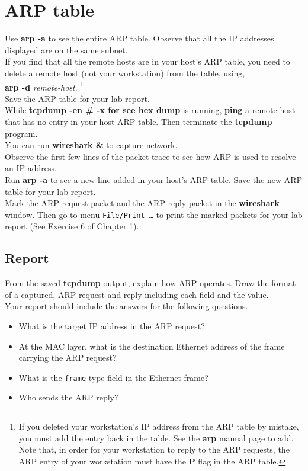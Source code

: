 \documentclass{../UTNetLab}
\begin{document}
\section{ARP table}
    Use \textbf{arp -a} to see the entire ARP table.
    Observe that all the IP addresses displayed are on the same subnet. \\
    If you find that all the remote hosts are in your host’s ARP table, you need to delete a remote host (not your workstation) from the table, using, \\
    \textbf{arp -d} \textit{remote-host}. \footnote{If you deleted your workstation’s IP address from the ARP table by mistake, you must add the entry back in the table. See the \textbf{arp} manual page to add.
    Note that, in order for your workstation to reply to the ARP requests, the ARP entry of your workstation must have the \textbf{P} flag in the ARP table.} \\
    Save the ARP table for your lab report. \\
    While \textbf{tcpdump -en \# -x for see hex dump} is running, \textbf{ping} a remote host that has no entry in your host ARP table.
    Then terminate the \textbf{tcpdump} program. \\
    You can run \textbf{wireshark \&} to capture network. \\
    Observe the first few lines of the packet trace to see how ARP is used to resolve an IP address. \\
    Run \textbf{arp -a} to see a new line added in your host’s ARP table.
    Save the new ARP table for your lab report. \\
    Mark the ARP request packet and the ARP reply packet in the \textbf{wireshark} window.
    Then go to menu \texttt{File/Print \ldots} to print the marked packets for your lab report (See Exercise 6 of Chapter 1). \\
    \subsection*{Report}
    From the saved \textbf{tcpdump} output, explain how ARP operates.
    Draw the format of a captured, ARP request and reply including each field and the value. \\
    Your report should include the answers for the following questions.
    \begin{itemize}
        \item What is the target IP address in the ARP request?
        \item At the MAC layer, what is the destination Ethernet address of the frame carrying the ARP request?
        \item What is the \texttt{frame} type field in the Ethernet frame?
        \item Who sends the ARP reply?
    \end{itemize}
\end{document}
